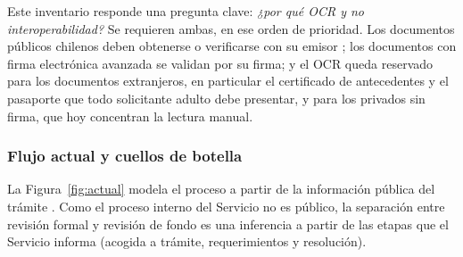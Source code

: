 \documentclass[11pt,a4paper]{article}
\begin{document}
Este inventario responde una pregunta clave: \emph{¿por qué OCR y no interoperabilidad?} Se requieren ambas, en ese orden de prioridad. Los documentos públicos chilenos deben obtenerse o verificarse con su emisor \cite{ley21180}; los documentos con firma electrónica avanzada se validan por su firma; y el OCR queda reservado para los documentos extranjeros, en particular el certificado de antecedentes y el pasaporte que todo solicitante adulto debe presentar, y para los privados sin firma, que hoy concentran la lectura manual.

\subsubsection{Flujo actual y cuellos de botella}
La Figura~\ref{fig:actual} modela el proceso a partir de la información pública del trámite \cite{sermigrd}. Como el proceso interno del Servicio no es público, la separación entre revisión formal y revisión de fondo es una inferencia a partir de las etapas que el Servicio informa (acogida a trámite, requerimientos y resolución).
\end{document}
